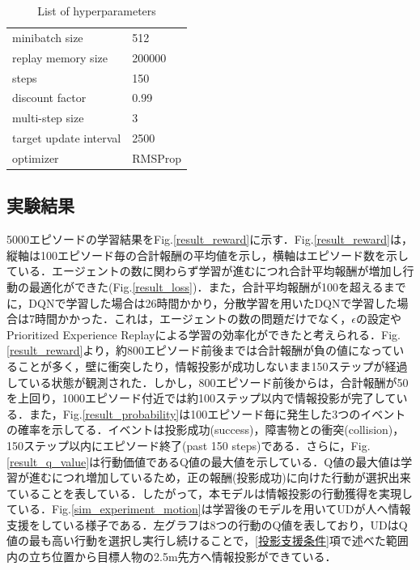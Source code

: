 \documentclass[12pt]{sonota/aislab}
\begin{document}
\begin{table}[t]
	\caption{List of hyperparameters}
	\label{table:list_hyperpaeameters}
	\centering 
	\begin{tabular}[tbp]{ll}
		\hline 
		minibatch size & 512 \\
		replay memory size & 200000 \\
		steps & 150 \\
		discount factor & 0.99 \\
		multi-step size & 3 \\
		target update interval & 2500 \\
		optimizer & RMSProp
		
	\end{tabular}
\end{table}

\subsection{実験結果}
5000エピソードの学習結果をFig.\ref{result_reward}に示す．Fig.\ref{result_reward}は，縦軸は100エピソード毎の合計報酬の平均値を示し，横軸はエピソード数を示している．エージェントの数に関わらず学習が進むにつれ合計平均報酬が増加し行動の最適化ができた(Fig.\ref{result_loss})．また，合計平均報酬が100を超えるまでに，DQNで学習した場合は26時間かかり，分散学習を用いたDQNで学習した場合は7時間かかった．これは，エージェントの数の問題だけでなく，$\epsilon$の設定やPrioritized Experience Replayによる学習の効率化ができたと考えられる．Fig.\ref{result_reward}より，約800エピソード前後までは合計報酬が負の値になっていることが多く，壁に衝突したり，情報投影が成功しないまま150ステップが経過している状態が観測された．しかし，800エピソード前後からは，合計報酬が50を上回り，1000エピソード付近では約100ステップ以内で情報投影が完了している．また，Fig.\ref{result_probability}は100エピソード毎に発生した3つのイベントの確率を示してる．イベントは投影成功(success)，障害物との衝突(collision)，150ステップ以内にエピソード終了(past 150 steps)である．さらに，Fig.\ref{result_q_value}は行動価値であるQ値の最大値を示している．Q値の最大値は学習が進むにつれ増加しているため，正の報酬(投影成功)に向けた行動が選択出来ていることを表している．したがって，本モデルは情報投影の行動獲得を実現している．Fig.\ref{sim_experiment_motion}は学習後のモデルを用いてUDが人へ情報支援をしている様子である．左グラフは8つの行動のQ値を表しており，UDはQ値の最も高い行動を選択し実行し続けることで，\ref{投影支援条件}項で述べた範囲内の立ち位置から目標人物の2.5m先方へ情報投影ができている．
\end{document}
